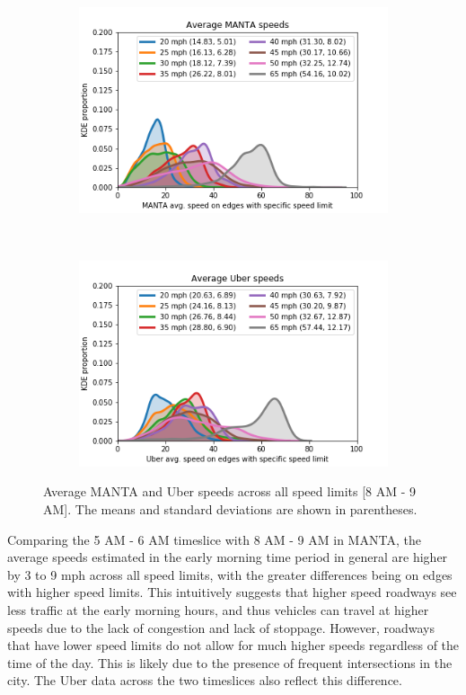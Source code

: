 \documentclass[final]{IEEEtran}
\begin{document}
\begin{figure}
    \centering
   \begin{subfigure}{\linewidth}
        \includegraphics[width=\linewidth]{figs/green_lights_8to9/avg_MANTA_speeds.png}
    \end{subfigure}\\
    \begin{subfigure}{\linewidth}
        \includegraphics[width=\linewidth]{figs/green_lights_8to9/avg_uber_speeds.png}
    \end{subfigure}
    \caption{Average MANTA and Uber speeds across all speed limits [8 AM - 9 AM]. The means and standard deviations are shown in parentheses.}
    \label{fig:avg_microsim_vs_uber_8to9}
\end{figure}

Comparing the 5 AM - 6 AM timeslice with 8 AM - 9 AM in MANTA, the average speeds estimated in the early morning time period in general are higher by 3 to 9 mph across all speed limits, with the greater differences being on edges with higher speed limits. This intuitively suggests that higher speed roadways see less traffic at the early morning hours, and thus vehicles can travel at higher speeds due to the lack of congestion and lack of stoppage. However, roadways that have lower speed limits do not allow for much higher speeds regardless of the time of the day. This is likely due to the presence of frequent intersections in the city. The Uber data across the two timeslices also reflect this difference.
\end{document}
